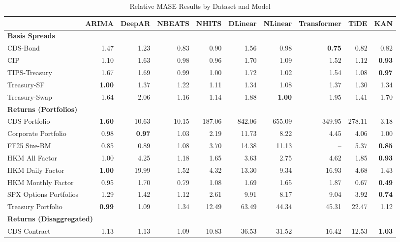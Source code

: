 
\begin{table}[htbp]
\centering
\caption{Relative MASE Results by Dataset and Model}
\label{tab:relative_mase_results}
\scriptsize
\setlength{\tabcolsep}{1.5pt}
\renewcommand{\arraystretch}{0.9}
\begin{tabular}{@{}lrrrrrrrrr@{}}
\toprule
 & ARIMA & DeepAR & NBEATS & NHITS & DLinear & NLinear & Transformer & TiDE & KAN \\
\midrule
\multicolumn{10}{l}{\textbf{Basis Spreads}} \\
CDS-Bond & 1.47 & 1.23 & 0.83 & 0.90 & 1.56 & 0.98 & \textbf{0.75} & 0.82 & 0.82 \\
CIP & 1.10 & 1.63 & 0.98 & 0.96 & 1.70 & 1.09 & 1.52 & 1.12 & \textbf{0.93} \\
TIPS-Treasury & 1.67 & 1.69 & 0.99 & 1.00 & 1.72 & 1.02 & 1.54 & 1.08 & \textbf{0.97} \\
Treasury-SF & \textbf{1.00} & 1.37 & 1.22 & 1.11 & 1.34 & 1.08 & 1.37 & 1.30 & 1.34 \\
Treasury-Swap & 1.64 & 2.06 & 1.16 & 1.14 & 1.88 & \textbf{1.00} & 1.95 & 1.41 & 1.70 \\
\midrule
\multicolumn{10}{l}{\textbf{Returns (Portfolios)}} \\
CDS Portfolio & \textbf{1.60} & 10.63 & 10.15 & 187.06 & 842.06 & 655.09 & 349.95 & 278.11 & 3.18 \\
Corporate Portfolio & 0.98 & \textbf{0.97} & 1.03 & 2.19 & 11.73 & 8.22 & 4.45 & 4.06 & 1.00 \\
FF25 Size-BM & 0.85 & 0.89 & 1.08 & 3.70 & 14.38 & 11.13 & -- & 5.37 & \textbf{0.85} \\
HKM All Factor & 1.00 & 4.25 & 1.18 & 1.65 & 3.63 & 2.75 & 4.62 & 1.85 & \textbf{0.93} \\
HKM Daily Factor & \textbf{1.00} & 19.99 & 1.52 & 4.32 & 13.30 & 9.34 & 16.93 & 4.68 & 1.43 \\
HKM Monthly Factor & 0.95 & 1.70 & 0.79 & 1.08 & 1.69 & 1.65 & 1.87 & 0.67 & \textbf{0.49} \\
SPX Options Portfolios & 1.29 & 1.42 & 1.12 & 2.61 & 9.91 & 8.17 & 9.04 & 3.92 & \textbf{0.74} \\
Treasury Portfolio & \textbf{0.99} & 1.09 & 1.34 & 12.49 & 63.49 & 44.34 & 45.31 & 22.47 & 1.12 \\
\midrule
\multicolumn{10}{l}{\textbf{Returns (Disaggregated)}} \\
CDS Contract & 1.13 & 1.13 & 1.09 & 10.83 & 36.53 & 31.52 & 16.42 & 12.53 & \textbf{1.03} \\

\end{tabular}
\end{table}
